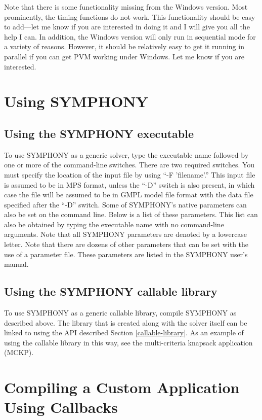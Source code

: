 Note that there is some functionality missing from the Windows version. Most
prominently, the timing functions do not work. This functionality
should be easy to add---let me know if you are interested in doing it and I
will give you all the help I can. In addition, the Windows version will only
run in sequential mode for a variety of reasons. However, it should be
relatively easy to get it running in parallel if you can get PVM working under
Windows. Let me know if you are interested.

\section{Using SYMPHONY}

\subsection{Using the SYMPHONY executable}

To use SYMPHONY as a generic solver, type the executable name followed by one
or more of the command-line switches. There are two required switches. You
must specify the location of the input file by using ``-F 'filename'.'' This
input file is assumed to be in MPS format, unless the ``-D'' switch is also
present, in which case the file will be assumed to be in GMPL model file
format with the data file specified after the ``-D'' switch. Some of
SYMPHONY's native parameters can also be set on the command line. Below is a
list of these parameters. This list can also be obtained by typing the
executable name with no command-line arguments. Note that all SYMPHONY
parameters are denoted by a lowercase letter. Note that there are dozens of
other parameters that can be set with the use of a parameter file. These
parameters are listed in the SYMPHONY user's manual.

\subsection{Using the SYMPHONY callable library}

To use SYMPHONY as a generic callable library, compile SYMPHONY as described
above. The library that is created along with the solver itself can be linked
to using the API described Section \ref{callable-library}. As an example of
using the callable library in this way, see the multi-criteria knapsack
application (MCKP).

\section{Compiling a Custom Application Using Callbacks}

